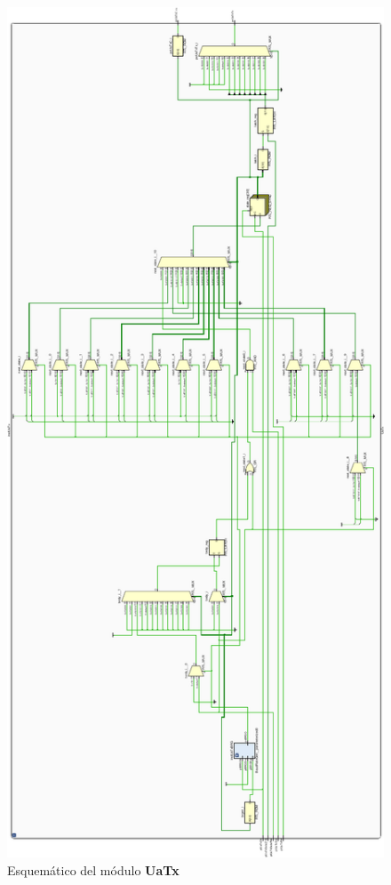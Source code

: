 \documentclass[12pt]{article}
\begin{document}
\begin{figure}[H]
    \centering
    \includegraphics[angle=270, width=\textwidth]{uart-tx-crop}
    \caption{Esquemático del módulo \textbf{UaTx}}
\end{figure}
\end{document}
